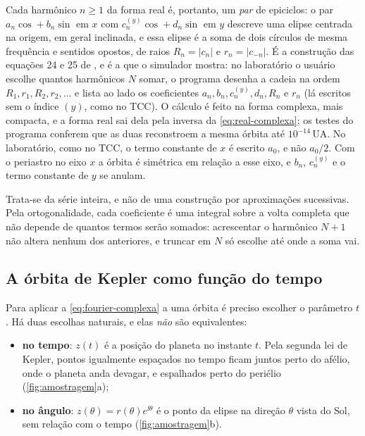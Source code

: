 Cada harmônico $n\geq1$ da forma real é, portanto, um \emph{par} de epiciclos: o par $a_n\cos + b_n\sin$ em $x$ com $c_n^{(y)}\cos + d_n\sin$ em $y$ descreve uma elipse centrada na origem, em geral inclinada, e essa elipse é a soma de dois círculos de mesma frequência e sentidos opostos, de raios $R_n = |c_n|$ e $r_n = |c_{-n}|$. É a construção das equações 24 e 25 de , e é a que o simulador mostra: no laboratório o usuário escolhe quantos harmônicos $N$ somar, o programa desenha a cadeia na ordem $R_1, r_1, R_2, r_2, \dots$ e lista ao lado os coeficientes $a_n, b_n, c_n^{(y)}, d_n, R_n$ e $r_n$ (lá escritos sem o índice $(y)$, como no TCC). O cálculo é feito na forma complexa, mais compacta, e a forma real sai dela pela inversa da \autoref{eq:real-complexa}; os testes do programa conferem que as duas reconstroem a mesma órbita até $10^{-14}$\,UA. No laboratório, como no TCC, o termo constante de $x$ é escrito $a_0$, e não $a_0/2$. Com o periastro no eixo $x$ a órbita é simétrica em relação a esse eixo, e $b_n$, $c_n^{(y)}$ e o termo constante de $y$ se anulam.

Trata-se da série inteira, e não de uma construção por aproximações sucessivas. Pela ortogonalidade, cada coeficiente é uma integral sobre a volta completa que não depende de quantos termos serão somados: acrescentar o harmônico $N+1$ não altera nenhum dos anteriores, e truncar em $N$ só escolhe até onde a soma vai.

\subsection{A órbita de Kepler como função do tempo}\label{sec:param-tempo}

Para aplicar a \autoref{eq:fourier-complexa} a uma órbita é preciso escolher o parâmetro $t$. Há duas escolhas naturais, e elas \emph{não} são equivalentes:

\begin{itemize}
  \item \textbf{no tempo}: $z(t)$ é a posição do planeta no instante $t$. Pela segunda lei de Kepler, pontos igualmente espaçados no tempo ficam juntos perto do afélio, onde o planeta anda devagar, e espalhados perto do periélio (\autoref{fig:amostragem}a);
  \item \textbf{no ângulo}: $z(\theta) = r(\theta)e^{\ii\theta}$ é o ponto da elipse na direção $\theta$ vista do Sol, sem relação com o tempo (\autoref{fig:amostragem}b).
\end{itemize}

